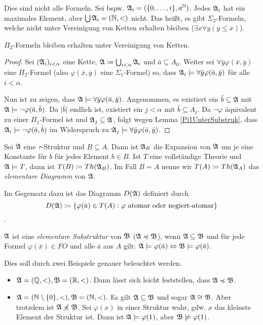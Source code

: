 Dies sind nicht alle Formeln. Sei bspw. $\mathfrak{A}_i=(\{0,\dots,i\},a^{\mathbb{N}})$. Jedes $\mathfrak{A}_i$ hat ein maximales Element, aber $\bigcup\mathfrak{A}_i=(\mathbb{N},<)$ nicht. Das heißt, es gibt $\Sigma_2$-Formeln, welche nicht unter Vereinigung von Ketten erhalten bleiben ($\exists x \forall y (y\leq x)$).

\begin{lemma}
	$\Pi_2$-Formeln bleiben erhalten unter Vereinigung von Ketten.
\end{lemma}
\begin{proof}
	Sei $(\mathfrak{A}_i)_{i<\alpha}$ eine Kette, $\mathfrak{A}\coloneqq\bigcup_{i<\alpha}\mathfrak{A}_i$ und $\bar{a}\subseteq A_0$. Weiter sei $\forall \bar{y} \varphi(\bar{x},\bar{y})$ eine $\Pi_2$-Formel (also $\varphi(\bar{x},\bar{y})$ eine $\Sigma_1$-Formel) so, dass $\mathfrak{A}_i\models\forall \bar{y} \varphi(\bar{a},\bar{y})$ für alle $i<\alpha$.
	
	Nun ist zu zeigen, dass $\mathfrak{A}\models\forall \bar{y} \varphi(\bar{a},\bar{y})$. Angenommen, es existiert ein $\bar{b}\subseteq\mathfrak{A}$ mit $\mathfrak{A}\models\neg\varphi(\bar{a},\bar{b})$. Da $\vert\bar{b}\vert$ endlich ist, existiert ein $j<\alpha$ mit $\bar{b}\subseteq A_j$. 
	Da $\neg\varphi$ äquivalent zu einer $\Pi_1$-Formel ist und $\mathfrak{A}_j\subseteq\mathfrak{A}$, folgt wegen Lemma \ref{Pi1UnterSubstruk}, dass $\mathfrak{A}_i\models\neg\varphi(\bar{a},\bar{b})$ im Widerspruch zu $\mathfrak{A}_j\models\forall\bar{y}\varphi(\bar{a},\bar{y})$.
\end{proof}

\begin{definition}
	Sei $\mathfrak{A}$ eine $\tau$-Struktur und $B\subseteq A$. Dann ist $\mathfrak{A}_B$ die Expansion von $\mathfrak{A}$ um je eine Konstante für $b$ für jedes Element $b\in B$. Ist $T$ eine vollständige Theorie und $\mathfrak{A}\models T$, dann ist $T(B)\coloneqq Th(\mathfrak{A}_B)$. Im Fall $B=A$ nenne wir $T(A)\coloneqq Th(\mathfrak{A}_A)$ das \textit{elementare Diagramm} von $\mathfrak{A}$.
\end{definition}
Im Gegensatz dazu ist das Diagramm $D(\mathfrak{A})$ definiert durch $$D(\mathfrak{A})\coloneqq\{\varphi(\bar{a})\in T(A) : \varphi \text{ atomar oder negiert-atomar}\}$$.

\begin{definition}
	$\mathfrak{A}$ ist eine \textit{elementare Substruktur} von $\mathfrak{B}$ ($\mathfrak{A}\preccurlyeq\mathfrak{B}$), wenn $\mathfrak{A}\subseteq\mathfrak{B}$ und für jede Formel $\varphi(\bar{x})\in FO$ und alle $\bar{a}$ aus $A$ gilt: $\mathfrak{A}\models\varphi(\bar{a})\Leftrightarrow\mathfrak{B}\models\varphi(\bar{a})$.
\end{definition}
Dies soll durch zwei Beispiele genauer beleuchtet werden. 

\begin{itemize}
	\item $\mathfrak{A}=(\mathbb{Q},<),\mathfrak{B}=(\mathbb{R},<)$. Dann lässt sich leicht feststellen, dass $\mathfrak{A}\preccurlyeq\mathfrak{B}$.
	\item $\mathfrak{A}=(\mathbb{N}\setminus\{0\},<), \mathfrak{B}=(\mathbb{N},<)$. Es gilt $\mathfrak{A}\subseteq\mathfrak{B}$ und sogar $\mathfrak{A}\cong\mathfrak{B}$. Aber trotzdem ist $\mathfrak{A}\not\preccurlyeq\mathfrak{B}$. Sei $\varphi(x)$ in einer Struktur wahr, gdw. $x$ das kleinste Element der Struktur ist. Dann ist $\mathfrak{A}\models\varphi(1)$, aber $\mathfrak{B}\not\models\varphi(1)$.
\end{itemize}

